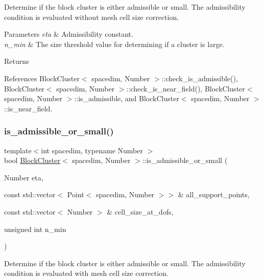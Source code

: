 Determine if the block cluster is either admissible or small. The admissibility condition is evaluated without mesh cell size correction.


\begin{DoxyParams}{Parameters}
{\em eta} & Admissibility constant. \\
\hline
{\em n\+\_\+min} & The size threshold value for determining if a cluster is large. \\
\hline
\end{DoxyParams}
\begin{DoxyReturn}{Returns}

\end{DoxyReturn}


References Block\+Cluster$<$ spacedim, Number $>$\+::check\+\_\+is\+\_\+admissible(), Block\+Cluster$<$ spacedim, Number $>$\+::check\+\_\+is\+\_\+near\+\_\+field(), Block\+Cluster$<$ spacedim, Number $>$\+::is\+\_\+admissible, and Block\+Cluster$<$ spacedim, Number $>$\+::is\+\_\+near\+\_\+field.

\mbox{\label{classBlockCluster_a620554d7d66beaf4dc38f166bc6dceed}} 
\subsubsection{\texorpdfstring{is\+\_\+admissible\+\_\+or\+\_\+small()}{is\_admissible\_or\_small()}\hspace{0.1cm}{\footnotesize\ttfamily [2/2]}}
{\footnotesize\ttfamily template$<$int spacedim, typename Number $>$ \\
bool \hyperlink{classBlockCluster}{Block\+Cluster}$<$ spacedim, Number $>$\+::is\+\_\+admissible\+\_\+or\+\_\+small (\begin{DoxyParamCaption}\item[{Number}]{eta,  }\item[{const std\+::vector$<$ Point$<$ spacedim, Number $>$$>$ \&}]{all\+\_\+support\+\_\+points,  }\item[{const std\+::vector$<$ Number $>$ \&}]{cell\+\_\+size\+\_\+at\+\_\+dofs,  }\item[{unsigned int}]{n\+\_\+min }\end{DoxyParamCaption})}

Determine if the block cluster is either admissible or small. The admissibility condition is evaluated with mesh cell size correction.


